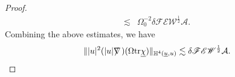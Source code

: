 \documentclass[11pt,reqno]{amsart}
\theoremstyle{definition}
\newtheorem{remark}{Remark}[section]
\numberwithin{equation}{section}
\newcommand{\tr}{\mathrm{tr}}
\renewcommand{\L}{\mathbb{L}}
\renewcommand{\H}{\mathbb{H}}
\def\chib{\underline{\chi}}
\def\Lb{\underline{L}}
\def\tr{\mathrm{tr}}
\def\ub{\underline{u}}
\def\nablas{\mbox{$\nabla \mkern -13mu /$ }}
\begin{document}
\begin{proof}
\begin{align*}
\lesssim&\Omega_0^{-2}\delta\mathscr{F}\mathscr{E}\mathscr{W}^{\frac{1}{2}}\mathcal{A}.
\end{align*}
Combining the above estimates,  we have
\begin{equation}\label{estimate-Omegatrchib}
\||u|^2(|u|\nablas)(\Omega\tr\chib)\|_{\H^4(\ub,u)}\lesssim\delta\mathscr{F}\mathscr{E}\mathscr{W}^{\frac{1}{2}}\mathcal{A}.
\end{equation}


\end{proof}
\end{document}
